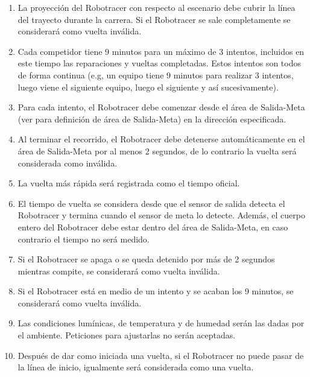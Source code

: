 \begin{enumerate}
  \item La proyección del Robotracer con respecto al escenario debe cubrir la línea del trayecto durante la carrera. Si el Robotracer se sale completamente se considerará como vuelta inválida.

  \item Cada competidor tiene 9 minutos para un máximo de 3 intentos, incluidos en este tiempo las reparaciones y vueltas completadas. Estos intentos son todos de forma continua (e.g, un equipo tiene 9 minutos para realizar 3 intentos, luego viene el siguiente equipo, luego el siguiente y así sucesivamente).

  \item Para cada intento, el Robotracer debe comenzar desde el área de Salida-Meta (ver  para definición de área de Salida-Meta) en la dirección especificada.

  \item Al terminar el recorrido, el Robotracer debe detenerse automáticamente en el área de Salida-Meta por al menos 2 segundos, de lo contrario la vuelta será considerada como inválida.

  \item La vuelta más rápida será registrada como el tiempo oficial.

  \item El tiempo de vuelta se considera desde que el sensor de salida detecta el Robotracer y termina cuando el sensor de meta lo detecte. Además, el cuerpo entero del Robotracer debe estar dentro del área de Salida-Meta, en caso contrario el tiempo no será medido.

  \item Si el Robotracer se apaga o se queda detenido por más de 2 segundos mientras compite, se considerará como vuelta inválida.

  \item Si el Robotracer está en medio de un intento y se acaban los 9 minutos, se considerará como vuelta inválida.

  \item Las condiciones lumínicas, de temperatura y de humedad serán las dadas por el ambiente. Peticiones para ajustarlas no serán aceptadas.

  \item Después de dar como iniciada una vuelta, si el Robotracer no puede pasar de la línea de inicio, igualmente será considerada como una vuelta.


\end{enumerate}
